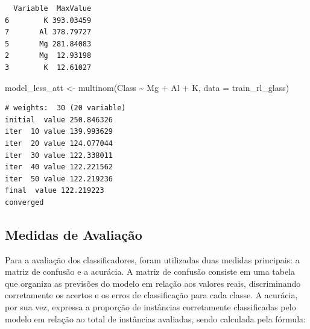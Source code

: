 \documentclass[
  letterpaper,
  DIV=11,
  numbers=noendperiod]{scrartcl}
\newenvironment{Shaded}{\begin{snugshade}}{\end{snugshade}}
\newcommand{\AttributeTok}[1]{\textcolor[rgb]{0.40,0.45,0.13}{#1}}
\newcommand{\CommentTok}[1]{\textcolor[rgb]{0.37,0.37,0.37}{#1}}
\newcommand{\FunctionTok}[1]{\textcolor[rgb]{0.28,0.35,0.67}{#1}}
\newcommand{\NormalTok}[1]{\textcolor[rgb]{0.00,0.23,0.31}{#1}}
\newcommand{\OtherTok}[1]{\textcolor[rgb]{0.00,0.23,0.31}{#1}}
\newcommand{\SpecialCharTok}[1]{\textcolor[rgb]{0.37,0.37,0.37}{#1}}
\begin{document}
\begin{verbatim}
  Variable  MaxValue
6        K 393.03459
7       Al 378.79727
5       Mg 281.84083
2       Mg  12.93198
3        K  12.61027
\end{verbatim}

\begin{Shaded}
\begin{Highlighting}[]
\NormalTok{model\_less\_att }\OtherTok{\textless{}{-}} \FunctionTok{multinom}\NormalTok{(Class }\SpecialCharTok{\textasciitilde{}}\NormalTok{ Mg }\SpecialCharTok{+}\NormalTok{ Al }\SpecialCharTok{+}\NormalTok{ K, }\AttributeTok{data =}\NormalTok{ train\_rl\_glass)}
\end{Highlighting}
\end{Shaded}

\begin{verbatim}
# weights:  30 (20 variable)
initial  value 250.846326 
iter  10 value 139.993629
iter  20 value 124.077044
iter  30 value 122.338011
iter  40 value 122.221562
iter  50 value 122.219236
final  value 122.219223 
converged
\end{verbatim}

\begin{Shaded}
\end{Shaded}

\subsection{Medidas de Avaliação}\label{medidas-de-avaliauxe7uxe3o-1}

Para a avaliação dos classificadores, foram utilizadas duas medidas
principais: a matriz de confusão e a acurácia. A matriz de confusão
consiste em uma tabela que organiza as previsões do modelo em relação
aos valores reais, discriminando corretamente os acertos e os erros de
classificação para cada classe. A acurácia, por sua vez, expressa a
proporção de instâncias corretamente classificadas pelo modelo em
relação ao total de instâncias avaliadas, sendo calculada pela fórmula:
\end{document}

